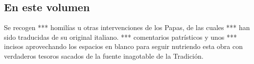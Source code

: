 \subsection{En este volumen}

Se recogen *** homilías u otras intervenciones de los Papas, de las cuales *** han sido traducidas de su original italiano. *** comentarios patrísticos y unos *** incisos aprovechando los espacios en blanco para seguir nutriendo esta obra con verdaderos tesoros sacados de la fuente inagotable de la Tradición.
